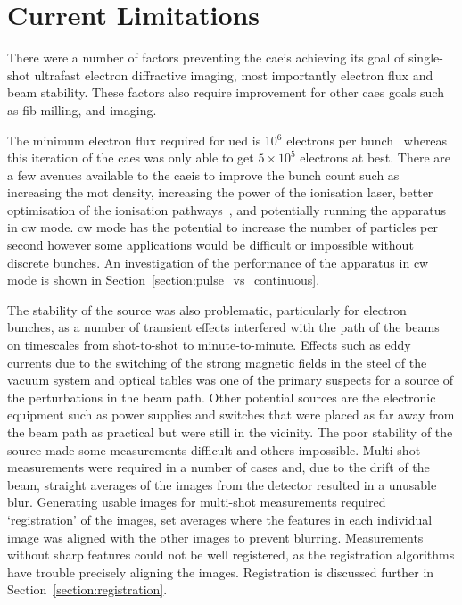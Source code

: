 \section{Current Limitations}

There were a number of factors preventing the \gls{caeis} achieving its goal of single-shot ultrafast electron diffractive imaging, most importantly electron flux and beam stability.
These factors also require improvement for other \gls{caes} goals such as \gls{fib} milling, and imaging.

The minimum electron flux required for \gls{ued} is 10$^6$ electrons per bunch~\cite{van_oudheusden_compression_2010} whereas this iteration of the \gls{caes} was only able to get $5\times10^5$ electrons at best.
There are a few avenues available to the \gls{caeis} to improve the bunch count such as increasing the \gls{mot} density, increasing the power of the ionisation laser, better optimisation of the ionisation pathways~\cite{mcculloch_field_2017}, and potentially running the apparatus in \gls{cw} mode.
\Gls{cw} mode  has the potential to increase the number of particles per second however some applications would be difficult or impossible without discrete bunches.
An investigation of the performance of the apparatus in \gls{cw} mode is shown in Section~\ref{section:pulse_vs_continuous}.

The stability of the source was also problematic, particularly for electron bunches, as a number of transient effects interfered with the path of the beams on timescales from shot-to-shot to minute-to-minute.
Effects such as eddy currents due to the switching of the strong magnetic fields in the steel of the vacuum system and optical tables was one of the primary suspects for a source of the perturbations in the beam path.
Other potential sources are the electronic equipment such as power supplies and switches that were placed as far away from the beam path as practical but were still in the vicinity.
The poor stability of the source made some measurements difficult and others impossible.
Multi-shot measurements were required in a number of cases and, due to the drift of the beam, straight averages of the images from the detector resulted in a unusable blur.
Generating usable images for multi-shot measurements required `registration' of the images, set averages where the features in each individual image was aligned with the other images to prevent blurring.
Measurements without sharp features could not be well registered, as the registration algorithms have trouble precisely aligning the images.
Registration is discussed further in Section~\ref{section:registration}.

